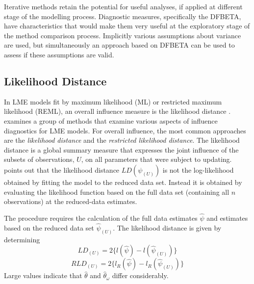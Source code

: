 \documentclass[12pt, a4paper]{report}
\theoremstyle{definition}
\theoremstyle{remark}
\begin{document}
Iterative methods retain the potential for useful analyses, if applied at different stage of the modelling process. Diagnostic measures, specifically the DFBETA, have characteristics that would make them very useful at the exploratory stage of the method comparison process. Implicitly various assumptions about variance are used, but simultaneously an approach based on DFBETA can be used to assess if these assumptions are valid.

\subsection{Likelihood Distance}
In LME models fit by  maximum likelihood (ML) or  restricted maximum likelihood (REML), an overall influence measure is the  likelihood distance \citep{CookWeisberg}. \citet{west} examines a group of methods that examine various aspects of influence diagnostics for LME models. For overall influence, the most common approaches are the \textit{likelihood distance} and the \textit{restricted likelihood distance}.
The  likelihood distance is a global summary measure that expresses the joint influence of the subsets of observations, $U$, on all parameters that were subject to updating. \citet{schabenberger} points out that the likelihood distance $LD(\psi_{(U)})$ is not the log-likelihood obtained by fitting the model to the reduced data set. Instead it is obtained by evaluating the likelihood function based on the full data set (containing all $n$ observations) at the reduced-data estimates.





The
procedure requires the calculation of the full data estimates
$\hat{\psi}$ and estimates based on the reduced data set
$\hat{\psi}_{(U)}$. The likelihood distance is given by
determining
\[
LD_{(U)} = 2\{l(\hat{\psi}) - l( \hat{\psi}_{(U)}) \}\]\[
RLD_{(U)} = 2\{l_{R}(\hat{\psi}) - l_{R}(\hat{\psi}_{(U)})\}
\]
Large values indicate that ${\hat{\theta}}$ and ${\hat{\theta}_\omega}$ differ considerably.



\end{document}
